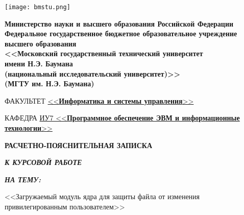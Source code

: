 \begin{titlepage}
	\noindent\begin{minipage}{0.05\textwidth}
		\texttt{[image: bmstu.png]}
	\end{minipage}
	\hfill
	\begin{minipage}{0.85\textwidth}\raggedleft
		\begin{center}
			\fontsize{12pt}{0.3\baselineskip}\selectfont \textbf{Министерство науки и высшего образования Российской Федерации \\ Федеральное государственное бюджетное образовательное учреждение \\ высшего образования \\ <<Московский государственный технический университет \\ имени Н.Э. Баумана \\ (национальный исследовательский университет)>> \\ (МГТУ им. Н.Э. Баумана)}
		\end{center}
	\end{minipage}

	\begin{center}
		\fontsize{12pt}{0.1\baselineskip}\selectfont
		\noindent\makebox[\linewidth]{\rule{\textwidth}{4pt}} \makebox[\linewidth]{\rule{\textwidth}{1pt}}
	\end{center}

	\begin{flushleft}
		\fontsize{12pt}{0.8\baselineskip}\selectfont 
		
		ФАКУЛЬТЕТ \uline{<<\textbf{Информатика и системы управления}>> \hfill}

		КАФЕДРА \uline{\mbox{\hspace{4mm}} ИУ7 <<\textbf{Программное обеспечение ЭВМ и информационные технологии}>> \hfill}
	\end{flushleft}

	\vfill

	\begin{center}
		\fontsize{20pt}{\baselineskip}\selectfont

		\textbf{РАСЧЕТНО-ПОЯСНИТЕЛЬНАЯ ЗАПИСКА}

		\textbf{\textit{К КУРСОВОЙ РАБОТЕ}}

		\textbf{\textit{НА ТЕМУ:}}
	\end{center}

	\begin{center}
		\fontsize{18pt}{0.6cm}\selectfont 
		
		<<Загружаемый модуль ядра для защиты файла от изменения привилегированным пользователем>>
		

\end{center}
\end{titlepage}
